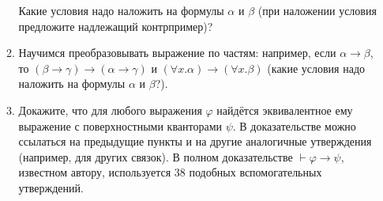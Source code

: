 \documentclass[10pt,a4paper,oneside]{article}
\begin{document}
\begin{enumerate}
\begin{enumerate}
Какие условия надо наложить на формулы $\alpha$ и $\beta$
(при наложении условия предложите надлежащий контрпример)?
\item Научимся преобразовывать выражение по частям: например, если $\alpha\rightarrow\beta$, то $(\beta\rightarrow\gamma) \rightarrow (\alpha\rightarrow\gamma)$
и $(\forall x.\alpha) \rightarrow (\forall x.\beta)$ (какие условия надо наложить на формулы $\alpha$ и $\beta$?).
\item Докажите, что для любого выражения $\varphi$ найдётся эквивалентное ему выражение с поверхностными кванторами $\psi$. В доказательстве можно ссылаться на предыдущие пункты
и на другие аналогичные утверждения (например, для других связок). В полном доказательстве $\vdash\varphi\rightarrow\psi$, известном автору, используется 38 подобных вспомогательных утверждений.
\end{enumerate}
\end{enumerate}
\end{document}
